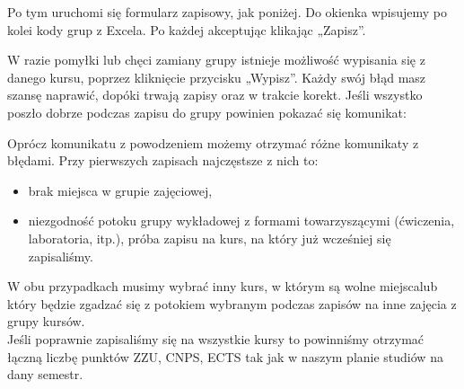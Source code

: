\documentclass[11pt]{article}
\begin{document}
\vspace{0.1cm}

\indent \hspace{0.5cm} Po tym uruchomi się formularz zapisowy, jak poniżej. Do okienka wpisujemy po kolei kody grup z Excela. Po każdej akceptując klikając „Zapisz”.


\vspace{0.1cm}

\indent \hspace{0.5cm} W razie pomyłki lub chęci zamiany grupy istnieje możliwość wypisania się z danego kursu, poprzez kliknięcie przycisku „Wypisz”. Każdy swój błąd masz szansę naprawić, dopóki trwają zapisy oraz w trakcie korekt. Jeśli wszystko poszło dobrze podczas zapisu do grupy powinien pokazać się komunikat:


\vspace{0.1cm}

\indent \hspace{0.5cm} Oprócz komunikatu z powodzeniem możemy otrzymać różne komunikaty z błędami. \linebreak Przy pierwszych zapisach najczęstsze z nich to:
\begin{itemize}
    \item brak miejsca w grupie zajęciowej,
    \item niezgodność potoku grupy wykładowej z formami towarzyszącymi (ćwiczenia, laboratoria, itp.), próba zapisu na kurs, na który już wcześniej się zapisaliśmy.
\end{itemize}

\indent \hspace{0.5cm} W obu przypadkach musimy wybrać inny kurs, w którym są wolne miejsca\linebreak lub który będzie zgadzać się z potokiem wybranym podczas zapisów na inne zajęcia z grupy kursów.\\

\indent \hspace{0.5cm} Jeśli poprawnie zapisaliśmy się na wszystkie kursy to powinniśmy otrzymać łączną liczbę punktów ZZU, CNPS, ECTS tak jak w naszym planie studiów na dany semestr.\\
\end{document}

